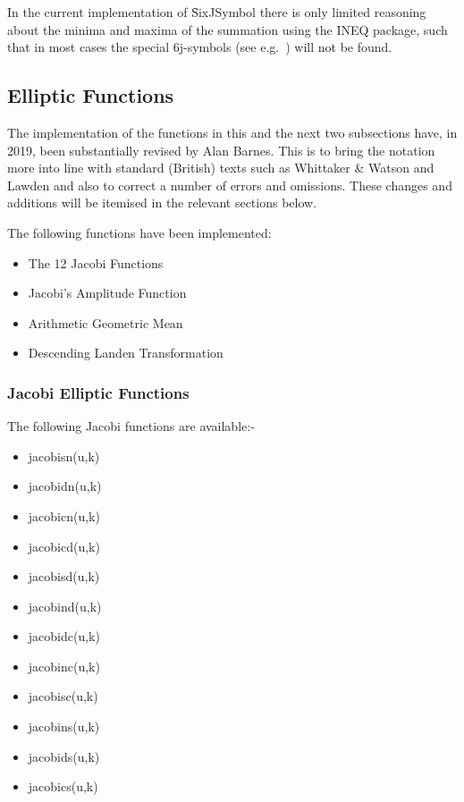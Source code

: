 In the current implementation of \f{SixJSymbol} there is only limited
reasoning about the minima and maxima of the summation using
the INEQ package, such that in most
cases the special 6j-symbols (see e.g.\ \cite{LandoltBoernstein:68})
will not be found.

\subsection{Elliptic Functions}
The implementation of the functions in this and the next two subsections have, in 2019,
been substantially revised by Alan Barnes. This is to bring the
notation more into line with standard (British) texts such as Whittaker
\& Watson \cite{WhittakerWatson:69} and Lawden \cite{Lawden:89} and also to correct
a number of errors and omissions. These changes and additions will be itemised in the relevant
sections below.

The following functions have been implemented:
\hypertarget{JACEF}{}
\begin{itemize}
\item The 12 Jacobi Functions
\item Jacobi's Amplitude Function
\item Arithmetic Geometric Mean
\item Descending Landen Transformation
\end{itemize}
\subsubsection{Jacobi Elliptic  Functions}
The following Jacobi functions are available:-
\hypertarget{operator:Jacobisn}{}
\hypertarget{operator:Jacobicn}{}
\hypertarget{operator:Jacobidn}{} 
\hypertarget{operator:Jacobicd}{}
\hypertarget{operator:Jacobisd}{}
\hypertarget{operator:Jacobind}{} 
\hypertarget{operator:Jacobidc}{}
\hypertarget{operator:Jacobinc}{}
\hypertarget{operator:Jacobisc}{} 
\hypertarget{operator:Jacobins}{}
\hypertarget{operator:Jacobids}{}
\hypertarget{operator:Jacobics}{} 
\begin{itemize}
\item jacobisn(u,k)
\item jacobidn(u,k)
\item jacobicn(u,k)
\item jacobicd(u,k)
\item jacobisd(u,k)
\item jacobind(u,k)
\item jacobidc(u,k)
\item jacobinc(u,k)
\item jacobisc(u,k)
\item jacobins(u,k)
\item jacobids(u,k)
\item jacobics(u,k)
\end{itemize}

